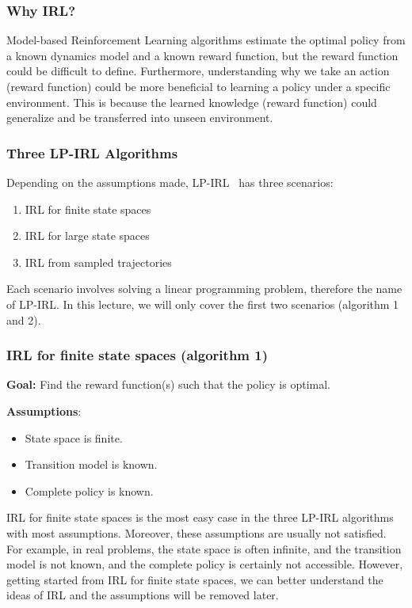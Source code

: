 \documentclass[11pt]{article}
\begin{document}
\subsubsection{Why IRL?}
Model-based Reinforcement Learning algorithms estimate the optimal policy from a known dynamics model and a known reward function, but the reward function could be difficult to define. Furthermore, understanding why we take an action (reward function) could be more beneficial to learning a policy under a specific environment. This is because the learned knowledge (reward function) could generalize and be transferred into unseen environment.

\subsubsection{Three LP-IRL Algorithms}
Depending on the assumptions made, LP-IRL~\cite{ng2000algorithms} has three scenarios:
\begin{enumerate}
    \item IRL for finite state spaces
    \item IRL for large state spaces
    \item IRL from sampled trajectories
\end{enumerate}
Each scenario involves solving a linear programming problem, therefore the name of LP-IRL. In this lecture, we will only cover the first two scenarios (algorithm 1 and 2).

\subsubsection{IRL for finite state spaces (algorithm 1)}
\textbf{Goal:} Find the reward function(s) such that the policy is optimal. 

\textbf{Assumptions}:
\begin{itemize}
    \item State space is finite.
    \item Transition model is known.
    \item Complete policy is known.
\end{itemize}

IRL for finite state spaces is the most easy case in the three LP-IRL algorithms with most assumptions. Moreover, these assumptions are usually not satisfied. For example, in real problems, the state space is often infinite, and the transition model is not known, and the complete policy is certainly not accessible. However, getting started from IRL for finite state spaces, we can better understand the ideas of IRL and the assumptions will be removed later.
\end{document}
